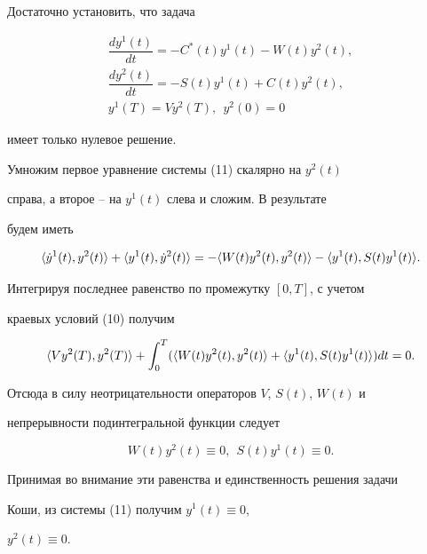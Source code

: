 \begin{pf}


Достаточно установить, что задача


\begin{equation}


\begin{array}{c}


\dfrac{dy^{1}(t)}{dt}=-C^{*}(t)y^{1}(t)-W(t)y^{2}(t),\\[2mm]


\dfrac{dy^{2}(t)}{dt}=-S(t)y^{1}(t)+C(t)y^{2}(t),\\[2mm]


y^{1}(T)=Vy^{2}(T),\ \ y^{2}(0)=0


\end{array}


\end{equation}


имеет только нулевое решение.





Умножим первое уравнение системы (11) скалярно на $y^{2}(t)$


справа, а второе -- на $y^{1}(t)$ слева и сложим. В результате


будем иметь


$$


\la\Dot y^1(t),y^{2}(t)\ra+


\la y^{1}(t),\Dot y^2(t)\ra=-\la W(t)y^{2}(t),y^{2}(t)\ra-


\la y^{1}(t),S(t)y^{1}(t)\ra.


$$


Интегрируя последнее равенство по промежутку $[0,T]$, с учетом


краевых условий (10) получим


$$


\la Vy^{2}(T),y^{2}(T)\ra+\int_{0}^{T}


(\la W(t)y^{2}(t),y^{2}(t)\ra+\la y^{1}(t),S(t)y^{1}(t)\ra)dt=0.


$$


Отсюда в силу неотрицательности операторов $V$, $S(t)$, $W(t)$ и


непрерывности подинтегральной функции следует


$$


W(t)y^{2}(t)\equiv 0,\ \ S(t)y^{1}(t)\equiv 0.


$$


Принимая во внимание эти равенства и единственность решения задачи


Коши, из системы (11) получим $y^{1}(t)\equiv 0$,


$y^{2}(t)\equiv 0$.


\end{pf}





